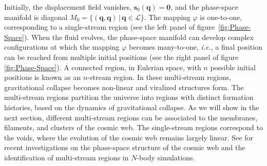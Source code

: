\documentclass[a4paper, 11pt]{article}
\begin{document}
Initially, the displacement field vanishes, $\bm{s}_0(\bm{q})=\bm{0}$, and the phase-space manifold is diagonal $M_0=\{(\bm{q},\bm{q})\,|\,\bm{q} \in \mathcal{L}\}$. The mapping $\varphi$ is one-to-one, corresponding to a single-stream region (see the left panel of figure\ \ref{fig:Phase-Space}). When the fluid evolves, the phase-space manifold can develop complex configurations at which the mapping $\varphi$ becomes many-to-one, \textit{i.e.}, a final position can be reached from multiple initial positions (see the right panel of figure \ref{fig:Phase-Space}). A connected region, in Eulerian space, with $n$ possible initial positions is known as an $n$-stream region. In these multi-stream regions, gravitational collapse becomes non-linear and viralized structures form. The multi-stream regions partition the universe into regions with distinct formation histories, based on the dynamics of gravitational collapse.  As we will show in the next section, different multi-stream regions can be associated to the membranes, filaments, and clusters of the cosmic web. The single-stream regions correspond to the voids, where the evolution of the cosmic web remains largely linear. See \cite{Hahn:2007, Abel:2012, Shandarin:2012,  Feldbrugge:2014b, Ramachandra:2015, Ramachandra:2017, Shandarin:2019, Shandarin:2021} for recent investigations on the phase-space structure of the cosmic web and the identification of multi-stream regions in $N$-body simulations.
\end{document}
